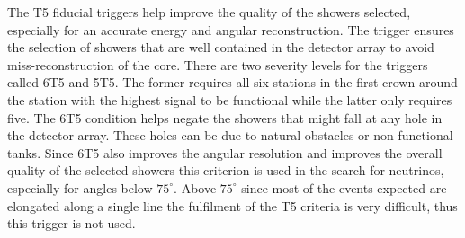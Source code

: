The T5 fiducial triggers help improve the quality of the showers selected, especially for an accurate energy and angular reconstruction. The trigger ensures the selection of showers that are well contained in the detector array to avoid miss-reconstruction of the core. There are two severity levels for the triggers called 6T5 and 5T5. The former requires all six stations in the first crown around the station with the highest signal to be functional while the latter only requires five. The 6T5 condition helps negate the showers that might fall at any hole in the detector array. These holes can be due to natural obstacles or non-functional tanks. Since 6T5 also improves the angular resolution and improves the overall quality of the selected showers this criterion is used in the search for neutrinos, especially for angles below $75^{\circ}$. Above $75^{\circ}$ since most of the events expected are elongated along a single line the fulfilment of the T5 criteria is very difficult, thus this trigger is not used. 


